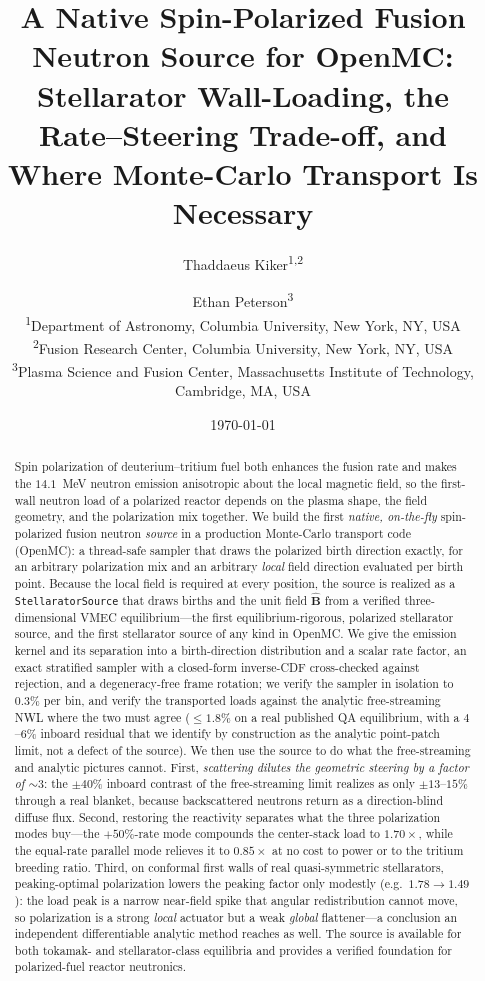 \documentclass[11pt]{article}
\title{\bfseries A Native Spin-Polarized Fusion Neutron Source for OpenMC:
Stellarator Wall-Loading, the Rate--Steering Trade-off, and Where Monte-Carlo
Transport Is Necessary}
\author{
Thaddaeus Kiker\textsuperscript{1,2}
\and
Ethan Peterson\textsuperscript{3}
\\[4pt]
\small \textsuperscript{1}Department of Astronomy, Columbia University, New York, NY, USA\\
\small \textsuperscript{2}Fusion Research Center, Columbia University, New York, NY, USA\\
\small \textsuperscript{3}Plasma Science and Fusion Center, Massachusetts Institute of Technology, Cambridge, MA, USA
}
\date{\today}
\newcommand{\Bhat}{\hat{\bm{B}}}
\begin{document}
\maketitle

\begin{abstract}
\noindent
Spin polarization of deuterium--tritium fuel both enhances the fusion rate and makes the
$14.1$~MeV neutron emission anisotropic about the local magnetic field, so the first-wall
neutron load of a polarized reactor depends on the plasma shape, the field geometry, and
the polarization mix together. We build the first \emph{native, on-the-fly} spin-polarized
fusion neutron \emph{source} in a production Monte-Carlo transport code (OpenMC): a
thread-safe sampler that draws the polarized birth direction exactly, for an arbitrary
polarization mix and an arbitrary \emph{local} field direction evaluated per birth point.
Because the local field is required at every position, the source is realized as a
\texttt{StellaratorSource} that draws births and the unit field $\Bhat$ from a verified
three-dimensional VMEC equilibrium---the first equilibrium-rigorous, polarized stellarator
source, and the first stellarator source of any kind in OpenMC. We give the emission kernel
and its separation into a birth-direction distribution and a scalar rate factor, an exact
stratified sampler with a closed-form inverse-CDF cross-checked against rejection, and a
degeneracy-free frame rotation; we verify the sampler in isolation to $0.3\%$ per bin, and
verify the transported loads against the analytic free-streaming NWL where the two must
agree ($\le1.8\%$ on a real published QA equilibrium, with a $4$--$6\%$ inboard residual
that we identify by construction as the analytic point-patch limit, not a defect of the
source). We then use the source to do what the free-streaming and analytic pictures
cannot. First, \emph{scattering dilutes the geometric steering by a factor of
$\sim\!3$}: the $\pm40\%$ inboard contrast of the free-streaming limit realizes as only
$\pm13$--$15\%$ through a real blanket, because backscattered neutrons return as a
direction-blind diffuse flux. Second, restoring the reactivity separates what the three
polarization modes buy---the $+50\%$-rate mode compounds the center-stack load to
$1.70\times$, while the equal-rate parallel mode relieves it to $0.85\times$ at no cost to
power or to the tritium breeding ratio. Third, on conformal first walls of real
quasi-symmetric stellarators, peaking-optimal polarization lowers the peaking factor only
modestly (e.g.\ $1.78\to1.49$): the load peak is a narrow near-field spike that angular
redistribution cannot move, so polarization is a strong \emph{local} actuator but a weak
\emph{global} flattener---a conclusion an independent differentiable analytic method
reaches as well. The source is available for both tokamak- and stellarator-class
equilibria and provides a verified foundation for polarized-fuel reactor neutronics.
\end{abstract}
\end{document}
